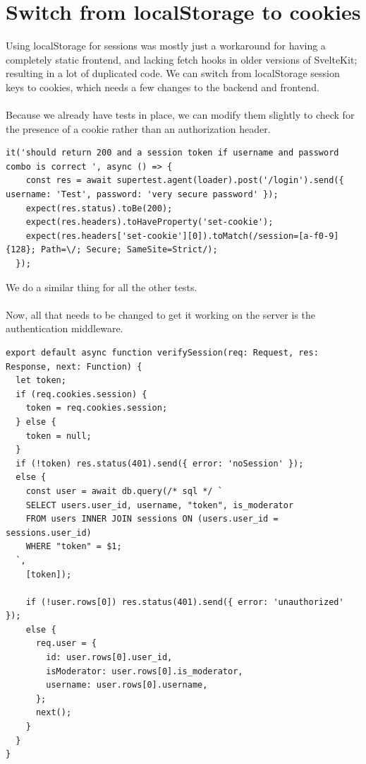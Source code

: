 \documentclass{report}
\begin{document}
\section{Switch from localStorage to cookies}
Using localStorage for sessions was mostly just a workaround for having a completely static frontend, and lacking fetch hooks in older versions of SvelteKit; resulting in a lot of duplicated code. We can switch from localStorage session keys to cookies, which needs a few changes to the backend and frontend.

\paragraph{}
Because we already have tests in place, we can modify  them slightly to check for the presence of a cookie rather than an authorization header.

\begin{verbatim}
it('should return 200 and a session token if username and password combo is correct ', async () => {
    const res = await supertest.agent(loader).post('/login').send({ username: 'Test', password: 'very secure password' });
    expect(res.status).toBe(200);
    expect(res.headers).toHaveProperty('set-cookie');
    expect(res.headers['set-cookie'][0]).toMatch(/session=[a-f0-9]{128}; Path=\/; Secure; SameSite=Strict/);
  });
\end{verbatim}

We do a similar thing for all the other tests.

\paragraph{}
Now, all that needs to be changed to get it working on the server is the authentication middleware.

\begin{verbatim}
export default async function verifySession(req: Request, res: Response, next: Function) {
  let token;
  if (req.cookies.session) {
    token = req.cookies.session;
  } else {
    token = null;
  }
  if (!token) res.status(401).send({ error: 'noSession' });
  else {
    const user = await db.query(/* sql */ `
    SELECT users.user_id, username, "token", is_moderator
    FROM users INNER JOIN sessions ON (users.user_id = sessions.user_id)
    WHERE "token" = $1;
  `,
    [token]);

    if (!user.rows[0]) res.status(401).send({ error: 'unauthorized' });
    else {
      req.user = {
        id: user.rows[0].user_id,
        isModerator: user.rows[0].is_moderator,
        username: user.rows[0].username,
      };
      next();
    }
  }
}
\end{verbatim}
\end{document}
